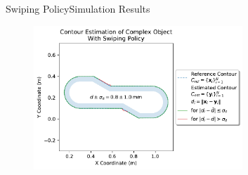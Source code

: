 \documentclass[AIRbeamer
,optEnglish
,optBiber
,optBibstyleAlphabetic
,optBeamerClassicFormat%
]{AIRlatex}
\begin{document}
    \begin{frame}{Swiping Policy}{Simulation Results}
        \begin{figure}[htb]
            \centering
            \includegraphics[width=0.7\textwidth]{figures/experiments/complex-object-swiping}
        \end{figure}
    \end{frame}
\end{document}
